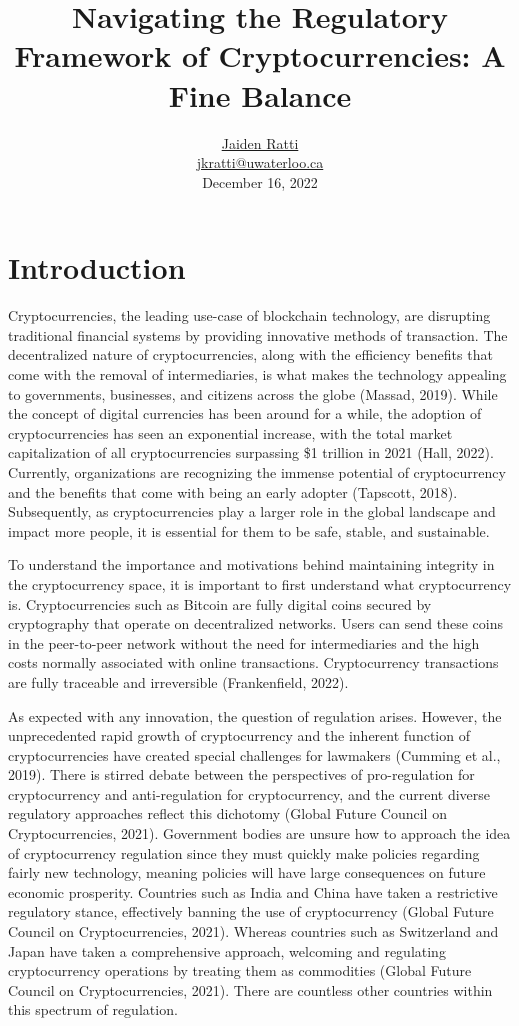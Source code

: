 \documentclass{article}
\title{\textbf{Navigating the Regulatory Framework of Cryptocurrencies: A Fine Balance}}
\author{
        \small \href{https://www.linkedin.com/in/jaidenratti/}{Jaiden Ratti} \\
        \small \href{mailto:jkratti@uwaterloo.com}{jkratti@uwaterloo.ca}\\
        
        \small \newline December 16, 2022
}
\date{}
\begin{document}
\maketitle

\section{Introduction}
\noindent Cryptocurrencies, the leading use-case of blockchain technology, are disrupting traditional financial systems by providing innovative methods of transaction. The decentralized nature of cryptocurrencies, along with the efficiency benefits that come with the removal of intermediaries, is what makes the technology appealing to governments, businesses, and citizens across the globe (Massad, 2019). While the concept of digital currencies has been around for a while, the adoption of cryptocurrencies has seen an exponential increase, with the total market capitalization of all cryptocurrencies surpassing \$1 trillion in 2021 (Hall, 2022). Currently, organizations are recognizing the immense potential of cryptocurrency and the benefits that come with being an early adopter (Tapscott, 2018). Subsequently, as cryptocurrencies play a larger role in the global landscape and impact more people, it is essential for them to be safe, stable, and sustainable.

\noindent \newline To understand the importance and motivations behind maintaining integrity in the cryptocurrency space, it is important to first understand what cryptocurrency is. Cryptocurrencies such as Bitcoin are fully digital coins secured by cryptography that operate on decentralized networks. Users can send these coins in the peer-to-peer network without the need for intermediaries and the high costs normally associated with online transactions. Cryptocurrency transactions are fully traceable and irreversible (Frankenfield, 2022).

\noindent \newline As expected with any innovation, the question of regulation arises. However, the unprecedented rapid growth of cryptocurrency and the inherent function of cryptocurrencies have created special challenges for lawmakers (Cumming et al., 2019). There is stirred debate between the perspectives of pro-regulation for cryptocurrency and anti-regulation for cryptocurrency, and the current diverse regulatory approaches reflect this dichotomy (Global Future Council on Cryptocurrencies, 2021). Government bodies are unsure how to approach the idea of cryptocurrency regulation since they must quickly make policies regarding fairly new technology, meaning policies will have large consequences on future economic prosperity. Countries such as India and China have taken a restrictive regulatory stance, effectively banning the use of cryptocurrency (Global Future Council on Cryptocurrencies, 2021). Whereas countries such as Switzerland and Japan have taken a comprehensive approach, welcoming and regulating cryptocurrency operations by treating them as commodities (Global Future Council on Cryptocurrencies, 2021). There are countless other countries within this spectrum of regulation.
\end{document}
